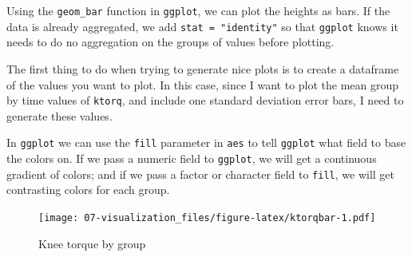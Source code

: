 \documentclass[
]{book}
\newenvironment{Shaded}{\begin{snugshade}}{\end{snugshade}}
\newcommand{\CommentTok}[1]{\textcolor[rgb]{0.56,0.35,0.01}{\textit{#1}}}
\newcommand{\DataTypeTok}[1]{\textcolor[rgb]{0.13,0.29,0.53}{#1}}
\newcommand{\KeywordTok}[1]{\textcolor[rgb]{0.13,0.29,0.53}{\textbf{#1}}}
\newcommand{\NormalTok}[1]{#1}
\newcommand{\OperatorTok}[1]{\textcolor[rgb]{0.81,0.36,0.00}{\textbf{#1}}}
\newcommand{\StringTok}[1]{\textcolor[rgb]{0.31,0.60,0.02}{#1}}
\begin{document}
Using the \texttt{geom\_bar} function in \texttt{ggplot}, we can plot the heights as bars. If the data is already aggregated, we add \texttt{stat\ =\ "identity"} so that \texttt{ggplot} knows it needs to do no aggregation on the groups of values before plotting.

The first thing to do when trying to generate nice plots is to create a dataframe of the values you want to plot. In this case, since I want to plot the mean group by time values of \texttt{ktorq}, and include one standard deviation error bars, I need to generate these values.

In \texttt{ggplot} we can use the \texttt{fill} parameter in \texttt{aes} to tell \texttt{ggplot} what field to base the colors on. If we pass a numeric field to \texttt{ggplot}, we will get a continuous gradient of colors; and if we pass a factor or character field to \texttt{fill}, we will get contrasting colors for each group.

\begin{Shaded}
\end{Shaded}

\begin{figure}
\centering
\texttt{[image: 07-visualization\_files/figure-latex/ktorqbar-1.pdf]}
\caption{\label{fig:ktorqbar}Knee torque by group}
\end{figure}
\end{document}
